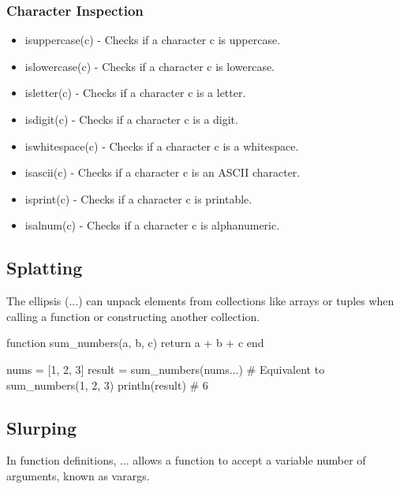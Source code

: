 \documentclass{report}
\begin{document}
    \bigbreak \noindent 
    \subsubsection{Character Inspection }
    \begin{itemize}
        \item isuppercase(c) - Checks if a character c is uppercase.
        \item islowercase(c) - Checks if a character c is lowercase.
        \item isletter(c) - Checks if a character c is a letter.
        \item isdigit(c) - Checks if a character c is a digit.
        \item iswhitespace(c) - Checks if a character c is a whitespace.
        \item isascii(c) - Checks if a character c is an ASCII character.
        \item isprint(c) - Checks if a character c is printable.
        \item isalnum(c) - Checks if a character c is alphanumeric.
    \end{itemize}

    \pagebreak 
    \bigbreak \noindent 
    \subsection{Splatting}
    \bigbreak \noindent 
    The ellipsis (...) can unpack elements from collections like arrays or tuples when calling a function or constructing another collection.
    \bigbreak \noindent 
    \begin{jlcode}
        function sum_numbers(a, b, c)
            return a + b + c
        end

        nums = [1, 2, 3]
        result = sum_numbers(nums...)  # Equivalent to sum_numbers(1, 2, 3)
        println(result)  # 6
    \end{jlcode}

    \bigbreak \noindent 
    \subsection{Slurping}
    \bigbreak \noindent 
    In function definitions, ... allows a function to accept a variable number of arguments, known as varargs.
    \bigbreak \noindent 
\end{document}
